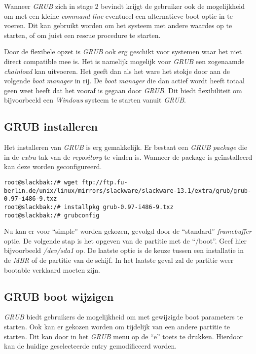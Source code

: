 Wanneer \emph{GRUB} zich in stage 2 bevindt krijgt de gebruiker ook de mogelijkheid om met een kleine \emph{command line} eventueel een alternatieve boot optie in te voeren. Dit kan gebruikt worden om het systeem met andere waardes op te starten, of om juist een rescue procedure te starten. 

Door de flexibele opzet is \emph{GRUB} ook erg geschikt voor systemen waar het niet direct compatible mee is. Het is namelijk mogelijk voor \emph{GRUB} een zogenaamde \emph{chainload} kan uitvoeren. Het geeft dan als het ware het stokje door aan de volgende \emph{boot manager} in rij. De \emph{boot manager} die dan actief wordt heeft totaal geen weet heeft dat het vooraf is gegaan door \emph{GRUB}. Dit biedt flexibiliteit om bijvoorbeeld een \emph{Windows} systeem te starten vanuit \emph{GRUB}. 

\subsection{GRUB installeren}\label{grub.boot.install}
Het installeren van \emph{GRUB} is erg gemakkelijk. Er bestaat een \emph{GRUB} \emph{package} die in de \emph{extra} tak van de \emph{repository} te vinden is. Wanneer de package is ge\"{i}nstalleerd kan deze worden geconfigureerd.
\begin{lstlisting}
root@slackbak:/# wget ftp://ftp.fu-berlin.de/unix/linux/mirrors/slackware/slackware-13.1/extra/grub/grub-0.97-i486-9.txz
root@slackbak:/# installpkg grub-0.97-i486-9.txz
root@slackbak:/# grubconfig 
\end{lstlisting}

Nu kan er voor ``simple'' worden gekozen, gevolgd door de ``standard'' \emph{framebuffer} optie. De volgende stap is het opgeven van de partitie met de ``/boot''. Geef hier bijvoorbeeld \emph{/dev/sda1} op. De laatste optie is de keuze tussen een installatie in de \emph{MBR} of de partitie van de schijf. In het laatste geval zal de partitie weer bootable verklaard moeten zijn. 

\subsection{GRUB boot wijzigen}\label{grub.boot.modify}
\emph{GRUB} biedt gebruikers de mogelijkheid om met gewijzigde boot parameters te starten. Ook kan er gekozen worden om tijdelijk van een andere partitie te starten. Dit kan door in het \emph{GRUB} menu op de ``e'' toets te drukken. Hierdoor kan de huidige geselecteerde entry gemodificeerd worden. 

